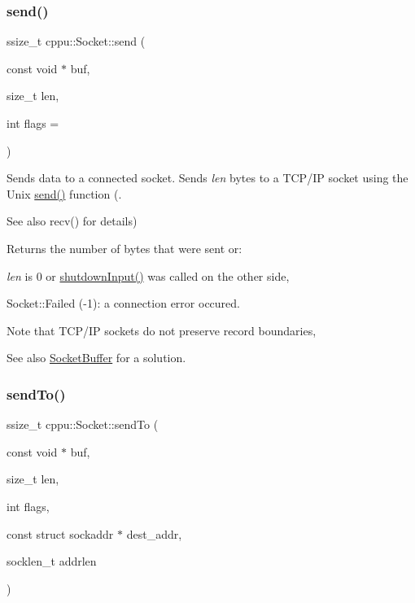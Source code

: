 \subsubsection{\texorpdfstring{send()}{send()}}
{\footnotesize\ttfamily ssize\+\_\+t cppu\+::\+Socket\+::send (\begin{DoxyParamCaption}\item[{const void $\ast$}]{buf,  }\item[{size\+\_\+t}]{len,  }\item[{int}]{flags = {} }\end{DoxyParamCaption})\hspace{0.3cm}{\ttfamily [inline]}}



Sends data to a connected socket. Sends {\itshape len} bytes to a T\+C\+P/\+IP socket using the Unix \mbox{\hyperlink{classcppu_1_1_socket_aeac77f859159715e2d63a5a0dc118788}{send()}} function (. 

\begin{DoxySeeAlso}{See also}
recv() for details)
\end{DoxySeeAlso}
\begin{DoxyReturn}{Returns}
the number of bytes that were sent or\+:
\begin{DoxyItemize}
\item {\itshape len} is 0 or \mbox{\hyperlink{classcppu_1_1_socket_a06c6838f267e5a0ba74558da946efb90}{shutdown\+Input()}} was called on the other side,
\item Socket\+::\+Failed (-\/1)\+: a connection error occured.
\end{DoxyItemize}
\end{DoxyReturn}
\begin{DoxyNote}{Note}
that T\+C\+P/\+IP sockets do not preserve record boundaries, 
\end{DoxyNote}
\begin{DoxySeeAlso}{See also}
\mbox{\hyperlink{classcppu_1_1_socket_buffer}{Socket\+Buffer}} for a solution. 
\end{DoxySeeAlso}
\mbox{\label{classcppu_1_1_socket_a31ff5137959aa4e52d4bcdd53e0b0069}} 
\subsubsection{\texorpdfstring{sendTo()}{sendTo()}}
{\footnotesize\ttfamily ssize\+\_\+t cppu\+::\+Socket\+::send\+To (\begin{DoxyParamCaption}\item[{const void $\ast$}]{buf,  }\item[{size\+\_\+t}]{len,  }\item[{int}]{flags,  }\item[{const struct sockaddr $\ast$}]{dest\+\_\+addr,  }\item[{socklen\+\_\+t}]{addrlen }\end{DoxyParamCaption})\hspace{0.3cm}{\ttfamily [inline]}}



